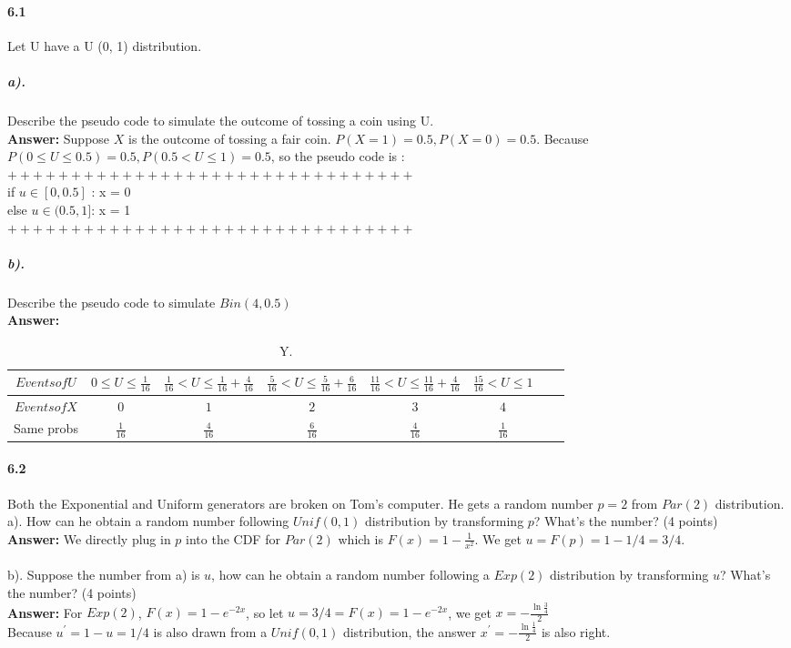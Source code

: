 \documentclass[11pt]{article} %
\begin{document}
\paragraph*{6.1} Let U have a U (0, 1) distribution.
\subparagraph*{a).} Describe the pseudo code to simulate the outcome of tossing a coin using U.\\
\textbf{Answer:} Suppose $X$ is the outcome of tossing a fair coin. $P(X = 1) = 0.5, P(X = 0) = 0.5$. Because $P(0 \leq U\leq 0.5)= 0.5, P(0.5 < U \leq 1) = 0.5$, so the pseudo code is :
$++++++++++++++++++++++++++++++++$ \\
if $u\in[0, 0.5]$ : x = 0 \\
else $u\in(0.5, 1]$: x = 1 \\
$++++++++++++++++++++++++++++++++$ \\
\subparagraph*{b).} Describe the pseudo code to simulate $Bin(4,0.5)$ \\
\textbf{Answer:} 

\begin{table}[h!]
\renewcommand{\arraystretch}{1.5}
\centering
\caption{Y.}
\label{Ta:6.1b}
\begin{tabular}{|c|c|c|c|c|c|c|c|} \hline
$Events of U$ & $0\leq U \leq \frac{1}{16}$ & $\frac{1}{16} < U \leq \frac{1}{16} + \frac{4}{16}$ & 
$\frac{5}{16} < U \leq \frac{5}{16}+\frac{6}{16}$ & $\frac{11}{16} < U \leq \frac{11}{16}+\frac{4}{16}$ & 
$\frac{15}{16} < U \leq 1$ \\ \hline 
$Events of X$ & $0$ & $1$ & 
$2$ & $3$ & 
$4$ \\ \hline 
Same probs & $\frac{1}{16}$ & $\frac{4}{16}$ & $\frac{6}{16}$ & $\frac{4}{16}$ & $\frac{1}{16}$ \\ \hline 
\end{tabular}
\end{table}


\paragraph*{6.2}
Both the Exponential and Uniform generators are broken on Tom's computer. He gets a random number $p=2$ from $Par(2)$ distribution.\\
a). How can he obtain a random number following $Unif(0,1)$ distribution by transforming $p$? What's the number? (4 points)\\
\textbf{Answer:} We directly plug in $p$ into the CDF for $Par(2)$ which is $F(x) = 1- \frac{1}{x^2}$. We get $u = F(p) = 1 - 1/4 = 3/4$.\\
\\
b). Suppose the number from a) is $u$, how can he obtain a random number following a $Exp(2)$ distribution by transforming $u$? What's the number? (4 points)\\
\textbf{Answer:} For $Exp(2)$, $F(x) = 1 - e^{-2x}$, so let $u = 3/4 = F(x)= 1 - e^{-2x}$, we get $x = -\frac{\ln \frac{3}{4}}{2}$ \\
Because $u^\prime = 1 - u = 1/4$ is also drawn from a $Unif(0,1)$ distribution, the answer $x^\prime = -\frac{\ln\frac{1}{4}}{2}$ is also right.
\end{document}
